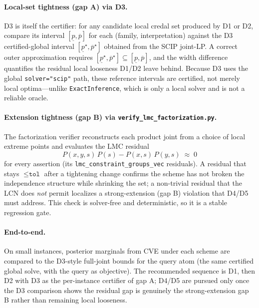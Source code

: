\documentclass[11pt]{article}
\begin{document}
\paragraph{Local-set tightness (gap A) via D3.}
D3 is itself the certifier: for any candidate local credal set produced by D1 or D2,
compare its interval $[\underline{p},\overline{p}]$ for each (family, interpretation)
against the D3 certified-global interval $[\underline{p}^\star,\overline{p}^\star]$
obtained from the SCIP joint-LP. A correct outer approximation requires
$[\underline{p}^\star,\overline{p}^\star]\subseteq[\underline{p},\overline{p}]$, and the
width difference quantifies the residual local looseness D1/D2 leave behind. Because D3
uses the global \texttt{solver="scip"} path, these reference intervals are certified, not
merely local optima---unlike \texttt{ExactInference}, which is only a local solver and is
not a reliable oracle.

\paragraph{Extension tightness (gap B) via \texttt{verify\_lmc\_factorization.py}.}
The factorization verifier reconstructs each product joint from a choice of local extreme
points and evaluates the LMC residual
\[
  P(x,y,s)\,P(s) - P(x,s)\,P(y,s) \;\approx\; 0
\]
for every assertion (its \texttt{lmc\_constraint\_groups\_vec} residuals). A residual that
stays $\le\texttt{tol}$ after a tightening change confirms the scheme has not broken the
independence structure while shrinking the set; a non-trivial residual that the LCN does
\emph{not} permit localizes a strong-extension (gap B) violation that D4/D5 must address.
This check is solver-free and deterministic, so it is a stable regression gate.

\paragraph{End-to-end.}
On small instances, posterior marginals from CVE under each scheme are compared to the
D3-style full-joint bounds for the query atom (the same certified global solve, with the
query as objective). The recommended sequence is D1, then D2 with D3 as the per-instance
certifier of gap A; D4/D5 are pursued only once the D3 comparison shows the residual gap is
genuinely the strong-extension gap B rather than remaining local looseness.
\end{document}
